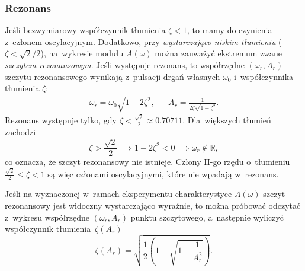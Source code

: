 \documentclass[paper=a4,DIV=12]{lpas}
\begin{document}
\begin{appendices}
  \subsubsection{Rezonans}
  \label{sec:8N4ZW}

  Jeśli bezwymiarowy współczynnik tłumienia $\zeta < 1$, to mamy do czynienia
  z~członem oscylacyjnym. Dodatkowo, przy {\em wystarczająco niskim tłumieniu}
  ($\zeta < \sqrt{2}/{2}$), na~wykresie modułu $A(\omega)$ można zauważyć
  ekstremum zwane {\em szczytem rezonansowym}. Jeśli występuje rezonans, to
  współrzędne $(\omega_r, A_r)$ szczytu rezonansowego wynikają z~pulsacji drgań
  własnych $\omega_0$ i~współczynnika tłumienia $\zeta$:
  \begin{equation}
    \begin{aligned}
      &
      \omega_r = \omega_0 \sqrt{1 - 2 \zeta^2},
      &&
      A_r = \frac{1}{2 \zeta \sqrt{1 - \zeta^2}}.
      &
    \end{aligned}
    \label{eq:EMIVT}
  \end{equation}
  Rezonans występuje tylko, gdy $\zeta < \frac{\sqrt{2}}{2} \approx 0.70711$.
  Dla~większych tłumień zachodzi
  \begin{equation}
    \zeta > \frac{\sqrt{2}}{2} \implies 1 - 2\zeta^2 < 0 \implies \omega_r \notin \mathbb{R},
  \end{equation}
  co oznacza, że szczyt rezonansowy nie istnieje. Człony II-go rzędu o~tłumieniu
  $\frac{\sqrt{2}}{2} \le \zeta < 1$ są więc członami oscylacyjnymi, które nie
  wpadają w~rezonans.

  Jeśli na wyznaczonej w~ramach eksperymentu charakterystyce $A(\omega)$ szczyt
  rezonansowy jest widoczny wystarczająco wyraźnie, to można próbować odczytać
  z~wykresu współrzędne $(\omega_r, A_r)$ punktu szczytowego, a~następnie
  wyliczyć współczynnik tłumienia~$\zeta(A_r)$
  \begin{equation}
    \zeta(A_r) = \sqrt{\frac{1}{2}\left(1 - \sqrt{1 - \frac{1}{A_r^2}}\right)}.
    \label{eq:SZENE}
  \end{equation}


\end{appendices}
\end{document}
